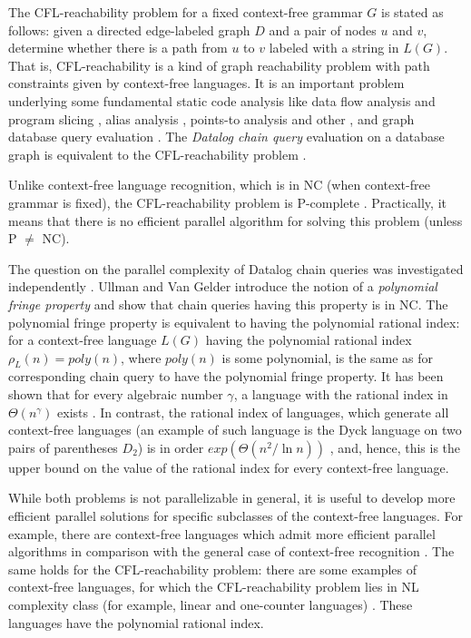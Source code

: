 \documentclass[11pt,a4paper]{article} %
\begin{document}
The CFL-reachability problem for a fixed context-free grammar $G$ is stated as follows: given a directed edge-labeled graph $D$ and a pair of nodes  $u$ and $v$, determine whether there is a path from $u$ to $v$ labeled with a string in $L(G)$. That is, CFL-reachability is a kind of graph reachability problem with path constraints given by context-free languages. It is an important problem underlying some fundamental static code analysis like data flow analysis and program slicing \cite{RepsBasic}, alias analysis \cite*{Chatterjee, alias}, points-to analysis \cite{Incremental} and other \cite{Cai, android, typeflow}, and graph database query evaluation \cite{Azimov, GrigorevRagozina, HellingsCFPQ, RDF}. The \textit{Datalog chain query} evaluation on a database graph is equivalent to the CFL-reachability problem \cite{10.1145/28659.28685, Ullman}. 


Unlike context-free language recognition, which is in NC (when context-free grammar is fixed), the CFL-reachability problem is P-complete \cite{ PCompl, RepSeq,  Yannakakis}. Practically, it means that there is no efficient parallel algorithm for solving this problem (unless P $\neq$ NC). 


The question on the parallel complexity of Datalog chain queries was investigated independently \cite{ChainQ, Vardi, Ullman}. Ullman and Van Gelder \cite{Ullman} introduce the notion of a \textit{polynomial fringe property} and show that chain queries having this property is in NC. The polynomial fringe property is equivalent to having the polynomial rational index: for a context-free language $L(G)$ having the polynomial rational index $\rho_L(n) = poly(n)$, where $poly(n)$ is some polynomial, is the same as for corresponding chain query to have the polynomial fringe property. It has been shown that for every algebraic number $\gamma$, a language with the rational index in $\Theta (n^\gamma )$ exists \cite{GreibRat}.  In contrast, the rational index of languages, which generate all context-free languages (an example of such language is the Dyck language on two pairs of parentheses $D_2$) is in order $exp(\Theta(n^2/\ln n))$ \cite{CFRat}, and, hence, this is the upper bound on the value of the rational index for every context-free language.


While both problems is not parallelizable in general, it is useful to develop more efficient parallel solutions for specific subclasses of the context-free languages. For example, there are context-free languages which admit more efficient parallel algorithms in comparison with the general case of context-free recognition \cite{IBARRA2, IBARRA, Okhotin2014ComplexityOI}.  The same holds for the CFL-reachability problem: there are some examples of context-free languages, for which the CFL-reachability problem lies in NL complexity class (for example, linear and one-counter languages) \cite{labelledGraphs, LReach, Regularrealizability, VyalyiRR}. These languages have the polynomial rational index.
\end{document}
